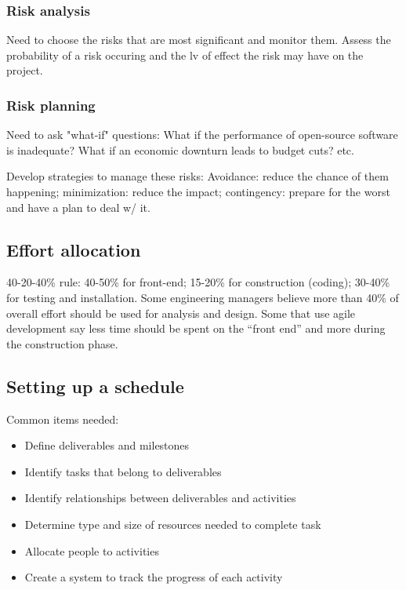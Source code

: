 \documentclass{article}
\begin{document}
    \subsubsection*{Risk analysis}
    
    Need to choose the risks that are most significant and monitor them. Assess the 
    probability of a risk occuring and the lv of effect the risk may have on the 
    project.

    \subsubsection*{Risk planning}

    Need to ask "what-if" questions: What if the performance of open-source software is 
    inadequate? What if an economic downturn leads to budget cuts? etc.

    Develop strategies to manage these risks: Avoidance: reduce the chance of 
    them happening; minimization: reduce the impact; contingency: prepare for the worst and 
    have a plan to deal w/ it.

    \subsection*{Effort allocation}

    40-20-40\% rule: 40-50\% for front-end; 15-20\% for construction (coding); 30-40\% for 
    testing and installation.
    Some engineering managers believe more than 40\% of overall effort should be
    used for analysis and design.
    Some that use agile development say less time
    should be spent on the “front end” and more during the construction phase.

    \subsection*{Setting up a schedule}

    Common items needed:
    \begin{itemize}
        \item Define deliverables and milestones
        \item Identify tasks that belong to deliverables
        \item Identify relationships between deliverables and activities
        \item Determine type and size of resources needed to complete task
        \item Allocate people to activities
        \item Create a system to track the progress of each activity
    \end{itemize}
\end{document}
